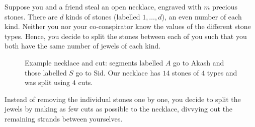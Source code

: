 \documentclass[12pt]{amsart}
\theoremstyle{definition}
\begin{document}
    Suppose you and a friend steal an open necklace, engraved with $m$
    precious stones. There are $d$ kinds of stones (labelled
    $1,\ldots,d$), an even number of each kind. Neither you nor your
    co-conspirator know the values of the different stone
    types. Hence, you decide to split the stones between each of you
    such that you both have the same number of jewels of each kind.
    
    \begin{figure}[h]
      \centering
      \caption{Example necklace and cut: segments labelled $A$ go to
        Akash and those labelled $S$ go to Sid. Our necklace has $14$
        stones of $4$ types and was split using $4$ cuts.}
    \end{figure}

    Instead of removing the individual stones one by one, you decide
    to split the jewels by making as few cuts as possible to the
    necklace, divvying out the remaining strands between yourselves.
\end{document}
